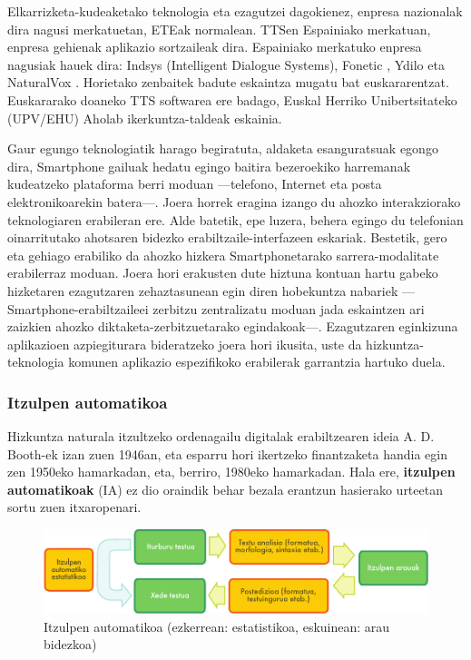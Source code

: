 \begin{multicols}{2}
Elkarrizketa-kudeaketako teknologia eta ezagutzei dagokienez, enpresa nazionalak dira nagusi merkatuetan, ETEak normalean. TTSen Espainiako merkatuan, enpresa gehienak aplikazio sortzaileak dira. Espainiako merkatuko enpresa nagusiak hauek dira: Indsys \cite{BAS-Nota30}  (Intelligent Dialogue Systems), Fonetic \cite{BAS-Nota31}, Ydilo \cite{BAS-Nota32}  eta NaturalVox \cite{BAS-Nota33}. Horietako zenbaitek badute eskaintza mugatu bat euskararentzat. Euskararako doaneko TTS softwarea ere badago, Euskal Herriko Unibertsitateko (UPV/EHU)  Aholab \cite{BAS-Nota34}  ikerkuntza-taldeak eskainia.

Gaur egungo teknologiatik harago begiratuta, aldaketa esanguratsuak egongo dira, Smartphone gailuak hedatu egingo baitira bezeroekiko harremanak kudeatzeko plataforma berri moduan —telefono, Internet eta posta elektronikoarekin batera—. Joera horrek eragina izango du ahozko interakziorako teknologiaren erabileran ere. Alde batetik, epe luzera, behera egingo du telefonian oinarritutako ahotsaren bidezko erabiltzaile-interfazeen eskariak. Bestetik, gero eta gehiago erabiliko da ahozko hizkera Smartphonetarako sarrera-modalitate erabilerraz moduan. Joera hori erakusten dute hiztuna kontuan hartu gabeko hizketaren ezagutzaren zehaztasunean egin diren hobekuntza nabariek —Smartphone-erabiltzaileei zerbitzu zentralizatu moduan jada eskaintzen ari zaizkien ahozko diktaketa-zerbitzuetarako egindakoak—. Ezagutzaren eginkizuna aplikazioen azpiegiturara bideratzeko joera hori ikusita, uste da hizkuntza-teknologia komunen aplikazio espezifikoko erabilerak garrantzia hartuko duela. 

\subsubsection{Itzulpen automatikoa}
  Hizkuntza naturala itzultzeko ordenagailu digitalak erabiltzearen ideia A. D. Booth-ek izan zuen 1946an, eta esparru hori ikertzeko finantzaketa handia egin zen 1950eko hamarkadan, eta,  berriro, 1980eko hamarkadan. Hala ere, \textbf{itzulpen automatikoak} (IA) ez dio oraindik behar bezala erantzun hasierako urteetan sortu zuen itxaropenari. 


\begin{figure}[htb]
  \center
  \includegraphics[width=\textwidth]{../_media/basque/machine_translation}
  \vspace{-2mm}
  \caption{Itzulpen automatikoa (ezkerrean: estatistikoa, eskuinean: arau bidezkoa)}
  \label{fig:mtarch_eu}
\end{figure}


\end{multicols}
